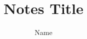 \documentclass[8pt]{article}
\author{Name}
\title{Notes Title}
\begin{document}
\maketitle
\tableofcontents


\blinddocument
\end{document}
